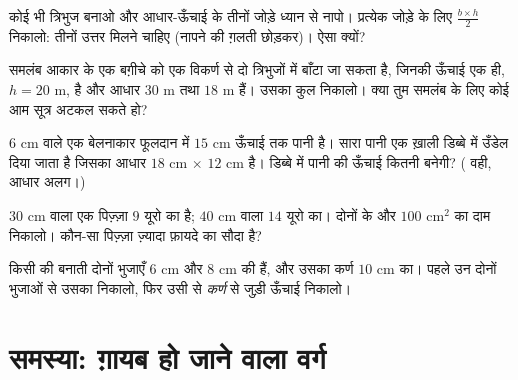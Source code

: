 \begin{exercise}[$\star\star$]\label{exo:g7:areas:8}
कोई भी त्रिभुज बनाओ और आधार-ऊँचाई के तीनों जोड़े ध्यान से नापो।
प्रत्येक जोड़े के लिए $\frac{b \times h}{2}$ निकालो: तीनों उत्तर
मिलने चाहिए (नापने की ग़लती छोड़कर)। ऐसा क्यों?
\end{exercise}

\begin{exercise}[$\star\star$]\label{exo:g7:areas:9}
समलंब आकार के एक बग़ीचे को एक विकर्ण से दो त्रिभुजों में बाँटा जा
सकता है, जिनकी ऊँचाई एक ही, $h = 20$ m, है और आधार $30$ m तथा
$18$ m हैं। उसका कुल  निकालो। क्या तुम समलंब के लिए कोई आम
सूत्र अटकल सकते हो?
\end{exercise}

\begin{exercise}[$\star\star$]\label{exo:g7:areas:10}
$6$ cm  वाले एक बेलनाकार फूलदान में $15$ cm ऊँचाई तक पानी
है। सारा पानी एक ख़ाली डिब्बे में उँडेल दिया जाता है जिसका आधार
$18$ cm $\times$ $12$ cm है। डिब्बे में पानी की ऊँचाई कितनी बनेगी?
( वही, आधार अलग।)
\end{exercise}

\begin{exercise}[$\star\star$]\label{exo:g7:areas:11}
$30$ cm  वाला एक पिज़्ज़ा $9$ यूरो का है; $40$ cm  वाला
$14$ यूरो का। दोनों के  और $100$ cm$^2$ का दाम निकालो।
कौन-सा पिज़्ज़ा ज़्यादा फ़ायदे का सौदा है?
\end{exercise}

\begin{exercise}[$\star\star\star$]\label{exo:g7:areas:12}
किसी  की  बनाती दोनों भुजाएँ $6$ cm और $8$ cm की
हैं, और उसका कर्ण $10$ cm का। पहले उन दोनों भुजाओं से उसका
 निकालो, फिर उसी  से \emph{कर्ण} से जुड़ी ऊँचाई
निकालो।
\end{exercise}

\section{समस्या: ग़ायब हो जाने वाला वर्ग}

